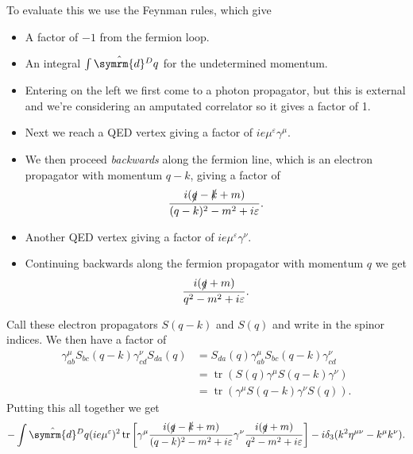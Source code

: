 \documentclass[fleqn]{NotesClass}
\newcommand{\dhat}[1]{\hat{\symrm{d}}{#1}}
\newcommand{\minkowskiMetric}{\eta}
\DeclareMathOperator{\tr}{tr}
\begin{document}
    To evaluate this we use the Feynman rules, which give
    \begin{itemize}
        \item A factor of \(-1\) from the fermion loop.
        \item An integral \(\int \dhat{^Dq}\) for the undetermined momentum.
        \item Entering on the left we first come to a photon propagator, but this is external and we're considering an amputated correlator so it gives a factor of 1.
        \item Next we reach a QED vertex giving a factor of \(ie\mu^\varepsilon \gamma^\mu\).
        \item We then proceed \emph{backwards} along the fermion line, which is an electron propagator with momentum \(q - k\), giving a factor of
        \begin{equation}
            \frac{i(\slashed{q} - \slashed{k} + m)}{(q - k)^2 - m^2 + i\varepsilon}.
        \end{equation}
        \item Another QED vertex giving a factor of \(ie\mu^\varepsilon \gamma^\nu\).
        \item Continuing backwards along the fermion propagator with momentum \(q\) we get
        \begin{equation}
            \frac{i(\slashed{q} + m)}{q^2 - m^2 + i\varepsilon}.
        \end{equation}
    \end{itemize}
    Call these electron propagators \(S(q - k)\) and \(S(q)\) and write in the spinor indices.
    We then have a factor of
    \begin{align}
        \gamma^\mu_{ab} S_{bc}(q - k)\gamma^\nu_{cd}S_{da}(q) &= S_{da}(q)\gamma^\mu_{ab} S_{bc}(q - k)\gamma^\nu_{cd}\\
        &= \tr(S(q)\gamma^\mu S(q - k)\gamma^\nu)\\
        &= \tr(\gamma^\mu S(q - k)\gamma^\nu S(q)).
    \end{align}
    Putting this all together we get
    \begin{equation*}
        -\int \dhat{^Dq} (ie\mu^\varepsilon)^2 \tr\left[ \gamma^\mu \frac{i(\slashed{q} - \slashed{k} + m)}{(q - k)^2 - m^2 + i\varepsilon} \gamma^\nu \frac{i(\slashed{q} + m)}{q^2 - m^2 + i\varepsilon} \right] - i\delta_3(k^2\minkowskiMetric^{\mu\nu} - k^\mu k^\nu).
    \end{equation*}
    
\end{document}
